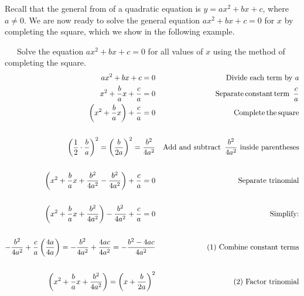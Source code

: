 {}\pp

Recall that the general from of a quadratic equation is $y=a x^2 + b x + c$, where $a\neq 0$. We are now ready to solve the general equation $ax^2+bx+c=0$ for $x$ by completing the square, which we show in the following example.

\begin{example}~~~Solve the equation $ax^2+bx+c=0$ for all values of $x$ using the method of completing the square.
  \begin{eqnarray*}
    a x^2 + b x + c = 0 &  & \text{Divide each term by~} a\\
		x^2 + \frac{b}{a} x +\frac{c}{a}=0 & & \tmop{Separate} \tmop{constant} \tmop{term~} \frac{c}{a}\\	
		\left( x^2 + \frac{b}{a} x\right) + \frac{c}{a} = 0 &  & \tmop{Complete} \tmop{the} \tmop{square}\\
    & & \\
		\left( \frac{1}{2} \cdot \frac{b}{a} \right)^2 = \left( \frac{b}{2 a}\right)^2 = \frac{b^2}{4 a^2} &  & \tmop{Add~and~subtract~} \frac{b^2}{4a^2}\text{~inside~parentheses}\\
    &  & \\
    \left( x^2 + \frac{b}{a} x+\frac{b^2}{4 a^2}-\frac{b^2}{4 a^2}\right) + \frac{c}{a} = 0 &  & \text{Separate~trinomial}\\
    &  & \\
	\left( x^2 + \frac{b}{a} x+\frac{b^2}{4 a^2}\right)-\frac{b^2}{4 a^2} + \frac{c}{a} = 0 &  & \text{Simplify:}\\
		& &\\
		-\frac{b^2}{4 a^2} + \frac{c}{a} \left( \frac{4 a}{4 a} \right) = -\frac{b^2}{4 a^2} + \frac{4 a c}{4 a^2} = -\frac{b^2 - 4 a c}{4 a^2} &  & (1) \text{~Combine~constant~terms}\\
		&  & \\
		\left( x^2 + \frac{b}{a} x+\frac{b^2}{4 a^2}\right)=\left( x + \frac{b}{2a}\right)^2& & (2) \text{~Factor~trinomial}\\

\end{eqnarray*}
\end{example}

